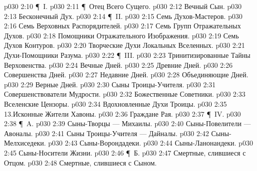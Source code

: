 \vs p030 2:10 \P\ I. 
\vs p030 2:11 \P\ \bibnobreakspace Отец Всего Сущего.
\vs p030 2:12 \bibnobreakspace Вечный Сын.
\vs p030 2:13 \bibnobreakspace Бесконечный Дух.
\vs p030 2:14 \P\ II. 
\vs p030 2:15 \bibnobreakspace Семь Духов\hyp{}Мастеров.
\vs p030 2:16 \bibnobreakspace Семь Верховных Распорядителей.
\vs p030 2:17 \bibnobreakspace Семь Групп Отражательных Духов.
\vs p030 2:18 \bibnobreakspace Помощники Отражательного Изображения.
\vs p030 2:19 \bibnobreakspace Семь Духов Контуров.
\vs p030 2:20 \bibnobreakspace Творческие Духи Локальных Вселенных.
\vs p030 2:21 \bibnobreakspace Духи\hyp{}Помощники Разума.
\vs p030 2:22 \P\ III. 
\vs p030 2:23 \bibnobreakspace Тринитизированные Тайны Верховенства.
\vs p030 2:24 \bibnobreakspace Вечные Дней.
\vs p030 2:25 \bibnobreakspace Древние Дней.
\vs p030 2:26 \bibnobreakspace Совершенства Дней.
\vs p030 2:27 \bibnobreakspace Недавние Дней.
\vs p030 2:28 \bibnobreakspace Объединяющие Дней.
\vs p030 2:29 \bibnobreakspace Верные Дней.
\vs p030 2:30 \bibnobreakspace Сыны Троицы\hyp{}Учителя.
\vs p030 2:31 \bibnobreakspace Совершенствователи Мудрости.
\vs p030 2:32 \bibnobreakspace Божественные Советники.
\vs p030 2:33 \bibnobreakspace Вселенские Цензоры.
\vs p030 2:34 \bibnobreakspace Вдохновленные Духи Троицы.
\vs p030 2:35 13.Исконные Жители Хавоны.
\vs p030 2:36 \bibnobreakspace Граждане Рая.
\vs p030 2:37 \P\ IV. 
\vs p030 2:38 \P\ A. 
\vs p030 2:39 \bibnobreakspace Сыны\hyp{}Творцы --- Михаилы.
\vs p030 2:40 \bibnobreakspace Сыны\hyp{}Повелители --- Авоналы.
\vs p030 2:41 \bibnobreakspace Сыны Троицы\hyp{}Учителя --- Дайналы.
\vs p030 2:42 \bibnobreakspace Сыны\hyp{}Мелхиседеки.
\vs p030 2:43 \bibnobreakspace Сыны\hyp{}Ворондадеки.
\vs p030 2:44 \bibnobreakspace Сыны\hyp{}Ланонандеки.
\vs p030 2:45 \bibnobreakspace Сыны\hyp{}Носители Жизни.
\vs p030 2:46 \P\ Б. 
\vs p030 2:47 \bibnobreakspace Смертные, слившиеся с Отцом.
\vs p030 2:48 \bibnobreakspace Смертные, слившиеся с Сыном.
